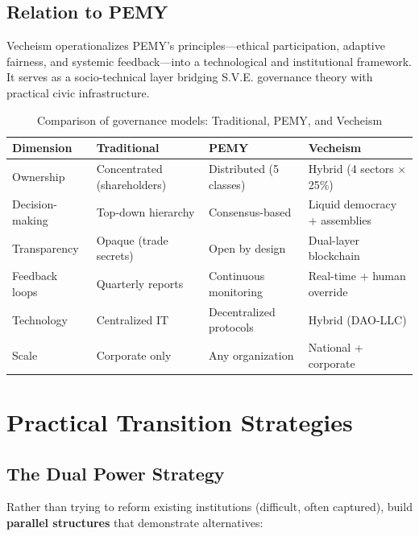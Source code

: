 \documentclass[11pt,a4paper]{article}
\theoremstyle{definition}
\theoremstyle{remark}
\begin{document}
\subsection{Relation to PEMY}

Vecheism operationalizes PEMY's principles---ethical participation, adaptive fairness, and systemic feedback---into a technological and institutional framework. It serves as a socio-technical layer bridging S.V.E. governance theory with practical civic infrastructure.

\begin{table}[H]
\centering
\caption{Comparison of governance models: Traditional, PEMY, and Vecheism}
\label{tab:governance_comparison}
\renewcommand{\arraystretch}{1.15}
\begin{tabularx}{\linewidth}{@{}lXXX@{}}
\toprule
\textbf{Dimension} & \textbf{Traditional} & \textbf{PEMY} & \textbf{Vecheism} \\
\midrule
Ownership & Concentrated (shareholders) & Distributed (5 classes) & Hybrid (4 sectors × 25\%) \\
Decision-making & Top-down hierarchy & Consensus-based & Liquid democracy + assemblies \\
Transparency & Opaque (trade secrets) & Open by design & Dual-layer blockchain \\
Feedback loops & Quarterly reports & Continuous monitoring & Real-time + human override \\
Technology & Centralized IT & Decentralized protocols & Hybrid (DAO-LLC) \\
Scale & Corporate only & Any organization & National + corporate \\
\bottomrule
\end{tabularx}
\end{table}

\section{Practical Transition Strategies}
\label{app:transition}

\subsection{The Dual Power Strategy}

Rather than trying to reform existing institutions (difficult, often captured), build \textbf{parallel structures} that demonstrate alternatives:
\end{document}
